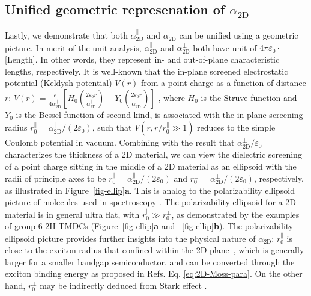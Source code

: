 \subsection{Unified geometric represenation of $\alpha_{\mathrm{2D}}$}
\label{sec:unif-geom-repr}

%
Lastly, we demonstrate that both $\alpha_{\mathrm{2D}}^{\parallel}$
and $\alpha_{\mathrm{2D}}^{\perp}$ can be unified using a geometric
picture. In merit of the unit analysis,
$\alpha_{\mathrm{2D}}^{\parallel}$ and $\alpha_{\mathrm{2D}}^{\perp}$
both have unit of $4\pi\varepsilon_{0} \cdot$[Length]. In other words,
they represent in- and out-of-plane characteristic lengths,
respectively. It is well-known that the in-plane screened
electrostatic potential (Keldysh potential) $V(r)$ from a point charge
as a function of distance $r$:
$V(r) = {\displaystyle \frac{e}{4 \alpha_{\mathrm{2D}}^{\parallel}}}
\left[H_{0}({\displaystyle \frac{2\varepsilon_{0}
      r}{\alpha_{\mathrm{2D}}^{\parallel}}}) - Y_{0}( {\displaystyle
    \frac{2
      \varepsilon_{0}r}{\alpha_{\mathrm{2D}}^{\parallel}}})\right]$
\cite{Keldysh_1979_eps_multi,Pulci_2014}, where $H_{0}$ is the Struve
function and $Y_{0}$ is the Bessel function of second kind, is
associated with the in-plane screening radius
$r_{0}^{\parallel}=\alpha_{\mathrm{2D}}^{\parallel}/(2
\varepsilon_{0})$, such that $V(r,r/r^{\parallel}_{0} \gg 1)$ reduces
to the simple Coulomb potential in vacuum. Combining with the result
that $\alpha_{\mathrm{2D}}^{\perp}/\varepsilon_{0}$ characterizes the
thickness of a 2D material, we can view the dielectric screening of a
point charge sitting in the middle of a 2D material as an ellipsoid
with the radii of principle axes to be
$r_{0}^{\parallel} = \alpha_{\mathrm{2D}}^{\parallel}/(2
\varepsilon_{0})$ and
$r_{0}^{\perp} = \alpha^{\perp}_{\mathrm{2D}}/(2 \varepsilon_{0})$,
respectively, as illustrated in Figure~\ref{fig-ellip}\textbf{a}.
This is analog to the polarizability ellipsoid picture of molecules
used in spectroscopy \cite{Banwell_1994}. The polarizability ellipsoid
for a 2D material is in general ultra flat, with
$r_{0}^{\parallel} \gg r_{0}^{\perp}$, as demonstrated by the examples
of group 6 2H TMDCs (Figure~\ref{fig-ellip}\textbf{a} and
~\ref{fig-ellip}\textbf{b}). The polarizability ellipsoid picture
provides further insights into the physical nature of
$\alpha_{\mathrm{2D}}$: $r_{0}^{\parallel}$ is close to the exciton
radius that confined within the 2D plane~\cite{Pulci_2014}, which is
generally larger for a smaller bandgap semiconductor, and can be
converted through the exciton binding energy as proposed in
Refs. \cite{Olsen_2016_hydrogen,Jiang_2017_Eg_Eb}
Eq. \ref{eq:2D-Moss-para}. On the other hand, $r_{0}^{\perp}$ may be
indirectly deduced from Stark effect
\cite{Pedersen_2016,Klein_2016,Roch_2018}.

